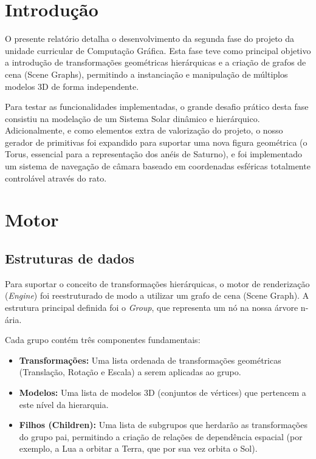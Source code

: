 \documentclass[12pt,a4paper]{article}
\begin{document}
\tableofcontents
\newpage

\section{Introdução} 
O presente relatório detalha o desenvolvimento da segunda fase do projeto da unidade curricular de Computação Gráfica. Esta fase teve como principal objetivo a introdução de transformações geométricas hierárquicas e a criação de grafos de cena (Scene Graphs), permitindo a instanciação e manipulação de múltiplos modelos 3D de forma independente.

Para testar as funcionalidades implementadas, o grande desafio prático desta fase consistiu na modelação de um Sistema Solar dinâmico e hierárquico. Adicionalmente, e como elementos extra de valorização do projeto, o nosso gerador de primitivas foi expandido para suportar uma nova figura geométrica (o Torus, essencial para a representação dos anéis de Saturno), e foi implementado um sistema de navegação de câmara baseado em coordenadas esféricas totalmente controlável através do rato.
\section{Motor} 

\subsection{Estruturas de dados} 
Para suportar o conceito de transformações hierárquicas, o motor de renderização (\textit{Engine}) foi reestruturado de modo a utilizar um grafo de cena (Scene Graph). A estrutura principal definida foi o \textit{Group}, que representa um nó na nossa árvore n-ária. 

Cada grupo contém três componentes fundamentais:
\begin{itemize}
    \item \textbf{Transformações:} Uma lista ordenada de transformações geométricas (Translação, Rotação e Escala) a serem aplicadas ao grupo.
    \item \textbf{Modelos:} Uma lista de modelos 3D (conjuntos de vértices) que pertencem a este nível da hierarquia.
    \item \textbf{Filhos (Children):} Uma lista de subgrupos que herdarão as transformações do grupo pai, permitindo a criação de relações de dependência espacial (por exemplo, a Lua a orbitar a Terra, que por sua vez orbita o Sol).
\end{itemize}
\end{document}
